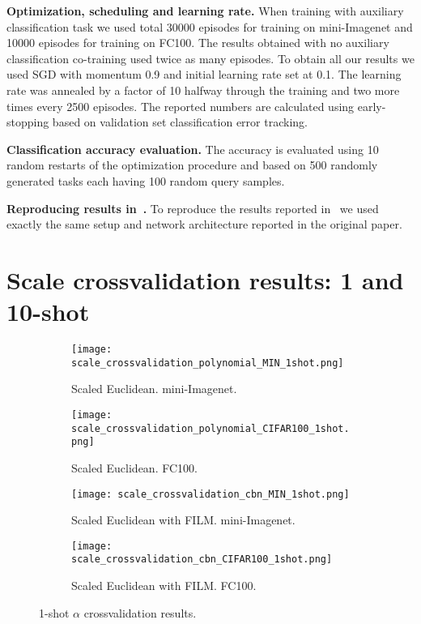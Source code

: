 \documentclass{article}
\begin{document}
\textbf{Optimization, scheduling and learning rate.} When training with auxiliary classification task we used total 30000 episodes for training on mini-Imagenet and 10000 episodes for training on FC100. The results obtained with no auxiliary classification co-training used twice as many episodes. To obtain all our results we used SGD with momentum 0.9 and initial learning rate set at 0.1. The learning rate was annealed by a factor of 10 halfway through the training and two more times every 2500 episodes. The reported numbers are calculated using early-stopping based on validation set classification error tracking.

\textbf{Classification accuracy evaluation.} The accuracy is evaluated using 10 random restarts of the optimization procedure and based on 500 randomly generated tasks each having 100 random query samples.

\textbf{Reproducing results in~\citep{snell2017prototypical}.} To reproduce the results reported in~\citep{snell2017prototypical} we used exactly the same setup and network architecture reported in the original paper.







\iffalse

\section{Scale crossvalidation results: 1 and 10-shot} \label{sec:one_shot_alpha_results}

\begin{figure}[t]
    \centering
    \begin{subfigure}[t]{0.49\textwidth}
        \texttt{[image: scale\_crossvalidation\_polynomial\_MIN\_1shot.png]}
        \caption{Scaled Euclidean. mini-Imagenet.}
        \label{fig:scaled_euclidean_miniimagenet_1shot}
    \end{subfigure}
    \begin{subfigure}[t]{0.49\textwidth}
        \texttt{[image: scale\_crossvalidation\_polynomial\_CIFAR100\_1shot.png]}
        \caption{Scaled Euclidean. FC100.}
        \label{fig:scaled_euclidean_cifar100_1shot}
    \end{subfigure}
    \begin{subfigure}[t]{0.49\textwidth}
        \texttt{[image: scale\_crossvalidation\_cbn\_MIN\_1shot.png]}
        \caption{Scaled Euclidean with FILM. mini-Imagenet.}
        \label{fig:scaled_euclidean_with_tbn_miniimagenet_1shot}
    \end{subfigure}
    \begin{subfigure}[t]{0.49\textwidth}
        \texttt{[image: scale\_crossvalidation\_cbn\_CIFAR100\_1shot.png]}
        \caption{Scaled Euclidean with FILM. FC100.}
        \label{fig:scaled_euclidean_with_tbn_cifar100_1shot}
    \end{subfigure}
    \caption{1-shot $\alpha$ crossvalidation results.}
    \label{fig:metric_scaling_1shot}
\end{figure}
\end{document}
